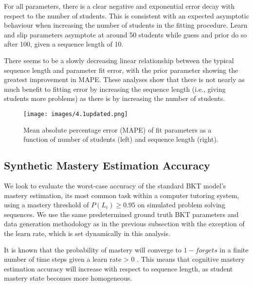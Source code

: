 \documentclass{edm_article}
\begin{document}
For all parameters, there is a clear negative and exponential error decay with respect to the number of students. This is consistent with an expected asymptotic behaviour when increasing the number of students in the fitting procedure. Learn and slip parameters asymptote at around 50 students while guess and prior do so after 100, given a sequence length of 10. 


There seems to be a slowly decreasing linear relationship between the typical sequence length and parameter fit error, with the prior parameter showing the greatest improvement in MAPE. These analyses show that there is not nearly as much benefit to fitting error by increasing the sequence length (i.e., giving students more problems) as there is by increasing the number of students.

\begin{figure}[h!]
\caption{Mean absolute percentage error (MAPE) of fit parameters as a function of number of students (left) and sequence length (right).}
\centering
\texttt{[image: images/4.1updated.png]}

\end{figure}

\subsection{Synthetic Mastery Estimation Accuracy}
We look to evaluate the worst-case accuracy of the standard BKT model's mastery estimation, its most common task within a computer tutoring system, using a mastery threshold of $P(L_{t}) \geq 0.95$ on simulated problem solving sequences. We use the same predetermined ground truth BKT parameters and data generation methodology as in the previous subsection with the exception of the learn rate, which is set dynamically in this analysis. 

It is known that the probability of mastery will converge to $1 - forgets$ in a finite number of time steps given a learn rate > 0 \cite{van2013properties}. This means that cognitive mastery estimation accuracy will increase with respect to sequence length, as student mastery state becomes more homogeneous.
\end{document}
